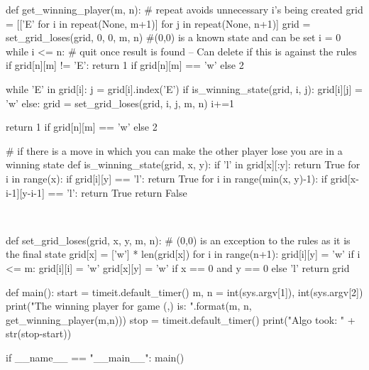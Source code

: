 \documentclass[a4paper,12pt]{article}
\begin{document}
\begin{enumerate}
\begin{python}
		
		def get_winning_player(m, n):
			# repeat avoids unnecessary i's being created
			grid = [['E' for i in repeat(None, m+1)] for j in repeat(None, n+1)]
			grid = set_grid_loses(grid, 0, 0, m, n) #(0,0) is a known state and can be set
			i = 0
			while i <= n:
				# quit once result is found -- Can delete if this is against the rules
				if grid[n][m] != 'E':
					return 1 if grid[n][m] == 'w' else 2
			
				while 'E' in grid[i]:
					j = grid[i].index('E')
					if is_winning_state(grid, i, j):
						grid[i][j] = 'w'
					else:
						grid = set_grid_loses(grid, i, j, m, n)
				i+=1
			
			return 1 if grid[n][m] == 'w' else 2
		\end{python}
	
		\begin{python}
		# if there is a move in which you can make the other player lose you are in a winning state
		def is_winning_state(grid, x, y):
			if 'l' in grid[x][:y]:
				return True
			for i in range(x):
				if grid[i][y] == 'l':
					return True
			for i in range(min(x, y)-1):
				if grid[x-i-1][y-i-1] == 'l':
					return True
			return False
		\end{python}~\\
	
		\begin{python}
		def set_grid_loses(grid, x, y, m, n):
			# (0,0) is an exception to the rules as it is the final state
			grid[x] = ['w'] * len(grid[x])
			for i in range(n+1):
				grid[i][y] = 'w'
				if i <= m:
					grid[i][i] = 'w'
			grid[x][y] = 'w' if x == 0 and y == 0 else 'l'
			return grid
		\end{python}
	
		\begin{python}
		def main():
			start = timeit.default_timer()
			m, n = int(sys.argv[1]), int(sys.argv[2])
			print("The winning player for game ({},{}) is: {}".format(m, n, get_winning_player(m,n)))
			stop = timeit.default_timer()
			print("Algo took: " + str(stop-start))
		
		
		if __name__ == "__main__":
			main()
		\end{python}
		
	\end{enumerate}
	
\end{document}
